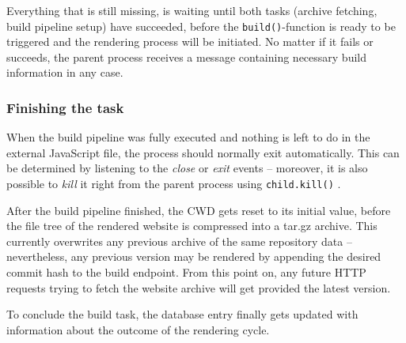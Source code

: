 Everything that is still missing, is waiting until both tasks (archive fetching, build pipeline setup) have succeeded, before the \texttt{build()}-function is ready to be triggered and the rendering process will be initiated. No matter if it fails or succeeds, the parent process receives a message containing necessary build information in any case.

\subsubsection{Finishing the task}
When the build pipeline was fully executed and nothing is left to do in the external JavaScript file, the process should normally exit automatically. This can be determined by listening to the \emph{close} or \emph{exit} events -- moreover, it is also possible to \emph{kill} it right from the parent process using \texttt{child.kill()} \cite{NodejsKillProcess}.

After the build pipeline finished, the CWD gets reset to its initial value, before the file tree of the rendered website is compressed into a tar.gz archive. This currently overwrites any previous archive of the same repository data -- nevertheless, any previous version may be rendered by appending the desired commit hash to the build endpoint. From this point on, any future HTTP requests trying to fetch the website archive will get provided the latest version.

To conclude the build task, the database entry finally gets updated with information about the outcome of the rendering cycle.
